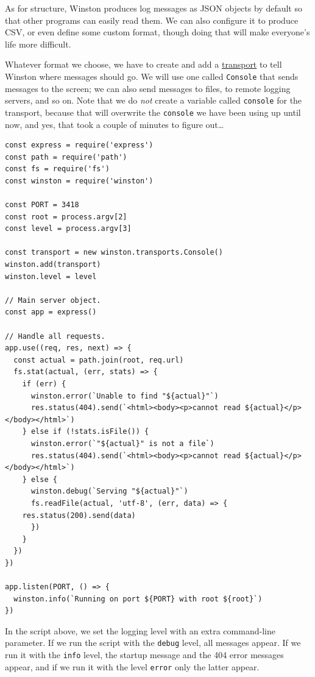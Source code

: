 As for structure, Winston produces log messages as JSON objects by
default so that other programs can easily read them. We can also
configure it to produce CSV, or even define some custom format, though
doing that will make everyone's life more difficult.

Whatever format we choose, we have to create and add a
\protect\hyperlink{g:logging-transport}{transport} to tell Winston where
messages should go. We will use one called \texttt{Console} that sends
messages to the screen; we can also send messages to files, to remote
logging servers, and so on. Note that we do \emph{not} create a variable
called \texttt{console} for the transport, because that will overwrite
the \texttt{console} we have been using up until now, and yes, that took
a couple of minutes to figure out\ldots{}

\begin{verbatim}
const express = require('express')
const path = require('path')
const fs = require('fs')
const winston = require('winston')

const PORT = 3418
const root = process.argv[2]
const level = process.argv[3]

const transport = new winston.transports.Console()
winston.add(transport)
winston.level = level

// Main server object.
const app = express()

// Handle all requests.
app.use((req, res, next) => {
  const actual = path.join(root, req.url)
  fs.stat(actual, (err, stats) => {
    if (err) {
      winston.error(`Unable to find "${actual}"`)
      res.status(404).send(`<html><body><p>cannot read ${actual}</p></body></html>`)
    } else if (!stats.isFile()) {
      winston.error(`"${actual}" is not a file`)
      res.status(404).send(`<html><body><p>cannot read ${actual}</p></body></html>`)
    } else {
      winston.debug(`Serving "${actual}"`)
      fs.readFile(actual, 'utf-8', (err, data) => {
    res.status(200).send(data)
      })
    }
  })
})

app.listen(PORT, () => {
  winston.info(`Running on port ${PORT} with root ${root}`)
})
\end{verbatim}

In the script above, we set the logging level with an extra command-line
parameter. If we run the script with the
\texttt{\textquotesingle{}debug\textquotesingle{}} level, all messages
appear. If we run it with the
\texttt{\textquotesingle{}info\textquotesingle{}} level, the startup
message and the 404 error messages appear, and if we run it with the
level \texttt{\textquotesingle{}error\textquotesingle{}} only the latter
appear.

